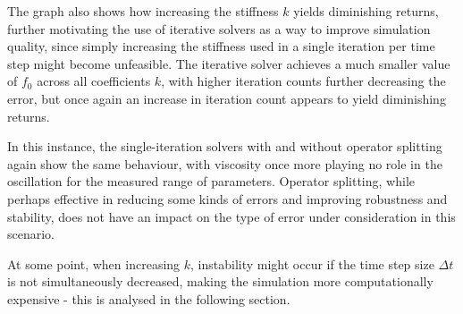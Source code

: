 The graph also shows how increasing the stiffness $k$ yields diminishing returns, further motivating the use of iterative solvers as a way to improve simulation quality, since simply increasing the stiffness used in a single iteration per time step might become unfeasible. The iterative solver achieves a much smaller value of $f_0$ across all coefficients $k$, with higher iteration counts further decreasing the error, but once again an increase in iteration count appears to yield diminishing returns.

In this instance, the single-iteration solvers with and without operator splitting again show the same behaviour, with viscosity once more playing no role in the oscillation for the measured range of parameters. Operator splitting, while perhaps effective in reducing some kinds of errors and improving robustness and stability, does not have an impact on the type of error under consideration in this scenario.


At some point, when increasing $k$, instability might occur if the time step size $\Delta t$ is not simultaneously decreased, making the simulation more computationally expensive - this is analysed in the following section.


